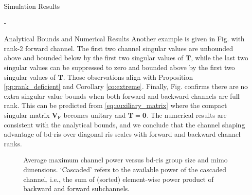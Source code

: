 \begin{section}{Simulation Results}
\begin{subsection}{-}
\begin{subsubsection}{Analytical Bounds and Numerical Results}
			Another example is given in Fig.  with rank-2 forward channel.
			The first two channel singular values are unbounded above and bounded below by the first two singular values of $\mathbf{T}$, while the last two singular values can be suppressed to zero and bounded above by the first two singular values of $\mathbf{T}$.
			Those observations align with Proposition \ref{pp:rank_deficient} and Corollary \ref{co:extreme}.
			Finally, Fig.  confirms there are no extra singular value bounds when both forward and backward channels are full-rank.
			This can be predicted from \eqref{eq:auxiliary_matrix} where the compact singular matrix $\mathbf{V}_\mathrm{F}$ becomes unitary and $\mathbf{T}=\mathbf{0}$.
			The numerical results are consistent with the analytical bounds, and we conclude that the channel shaping advantage of \gls{bd}-\gls{ris} over diagonal \gls{ris} scales with forward and backward channel ranks.

			\begin{figure}[H]
				\centering
				\caption{
					Average maximum channel power versus \gls{bd}-\gls{ris} group size and \gls{mimo} dimensions.
					`Cascaded' refers to the available power of the cascaded channel, i.e., the sum of (sorted) element-wise power product of backward and forward subchannels.
				}
				\label{fg:power_bond}
			\end{figure}


\end{subsubsection}
\end{subsection}
\end{section}
